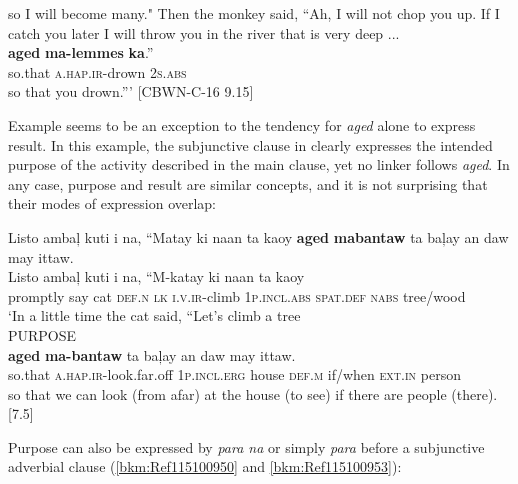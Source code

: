     \glt so I will become many." Then the monkey said, “Ah, I will not chop you up. If I catch you later I will throw you in the river that is very deep ... \\
    \ex
    \gll \textbf{aged}  \textbf{ma-lemmes}  \textbf{ka}.” \\
    so.that  \textsc{a.hap.ir}-drown  2\textsc{s.abs} \\
    \glt so that you drown.”' [CBWN-C-16 9.15]
    \z
\z

Example  seems to be an exception to the tendency for \textit{aged} alone to express result. In this example, the subjunctive clause in  clearly expresses the intended purpose of the activity described in the main clause, yet no linker follows \textit{aged}. In any case, purpose and result are similar concepts, and it is not surprising that their modes of expression overlap:

\ea
\label{bkm:Ref115099741}
Listo  ambaļ  kuti  i  na,  “Matay  ki  naan  ta kaoy  \textbf{aged}  \textbf{mabantaw}  ta  baļay  an  daw may  ittaw. \smallskip\\
    \ea
    \gll Listo  ambaļ  kuti  i  na,  “M-katay  ki  naan  ta kaoy   \\
    promptly  say  cat  \textsc{def.n  lk  i.v.ir}-climb  1\textsc{p.incl.abs}  \textsc{spat.def}  \textsc{nabs} tree/wood \\
    \glt `In a little time the cat said, “Let’s climb a tree \\\smallskip
\ex
    \label{bkm:Ref115099741b}
    PURPOSE \\
    \gll \textbf{aged}  \textbf{ma-bantaw}  ta  baļay  an  daw may  ittaw. \\
    so.that  \textsc{a.hap.ir}-look.far.off  1\textsc{p.incl.erg}  house  \textsc{def.m}  if/when \textsc{ext.in} person \\
    \glt so that we can look (from afar) at the house (to see) if there are people (there). [7.5]
    \z
\z

\largerpage
Purpose can also be expressed by \textit{para na} or simply \textit{para} before a subjunctive adverbial clause (\ref{bkm:Ref115100950} and \ref{bkm:Ref115100953}):

